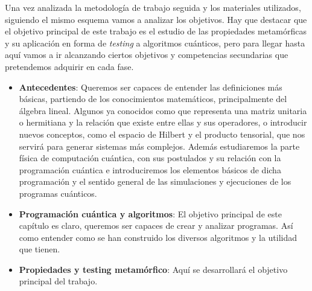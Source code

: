 Una vez analizada la metodología de trabajo seguida y los materiales utilizados, siguiendo el mismo esquema vamos a analizar los objetivos. Hay que destacar que el objetivo principal de este trabajo es el estudio de las propiedades metamórficas y su aplicación en forma de \textit{testing} a algoritmos cuánticos, pero para llegar hasta aquí vamos a ir alcanzando ciertos objetivos y competencias secundarias que pretendemos adquirir en cada fase. 

\begin{itemize}
    \item \textbf{Antecedentes}: Queremos ser capaces de entender las definiciones más básicas, partiendo de los conocimientos matemáticos, principalmente del álgebra lineal. Algunos ya conocidos como que representa una matriz unitaria o hermitiana y la relación que existe entre ellas y sus operadores, o introducir nuevos conceptos, como el espacio de Hilbert y el producto tensorial, que nos servirá para generar sistemas más complejos. Además estudiaremos la parte física de computación cuántica, con sus postulados y su relación con la programación cuántica e introduciremos los elementos básicos de dicha programación y el sentido general de las simulaciones y ejecuciones de los programas cuánticos.
    
    \item \textbf{Programación cuántica y algoritmos}: El objetivo principal de este capítulo es claro, queremos ser capaces de crear y analizar programas. Así como entender como se han construido los diversos algoritmos y la utilidad que tienen.

    \item \textbf{Propiedades y testing metamórfico}: Aquí se desarrollará el objetivo principal del trabajo.
\end{itemize}

\vspace{1cm}